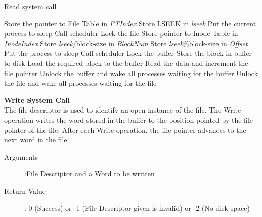 \documentclass[10pt]{article}
\begin{document}
\begin{algorithm}
\caption{Read system call}
\begin{algorithmic}
\ENDIF
{}
\ELSE 
    \STATE Store the pointer to File Table in  \textit{FTIndex}
    \STATE Store LSEEK in \textit{lseek}
\ENDIF
{}
            \STATE Put the current process to sleep
            \STATE Call scheduler
        \ENDWHILE
    \ENDIF
\ENDIF
\STATE Lock the file
\STATE Store pointer to Inode Table in  \textit{InodeIndex}
\ELSE 
    \STATE Store \textit{lseek}/block-size in \textit{BlockNum}
    \STATE Store \textit{lseek}\%block-size in \textit{Offset}
\ENDIF
{}
            \STATE Put the process to sleep 
            \STATE Call scheduler
        \ENDWHILE
    \ENDIF
\ENDIF
\STATE Lock the buffer
        \STATE Store the block in buffer to disk
    \ENDIF
    \STATE Load the required block to the buffer
\ENDIF
\STATE Read the data and increment the file pointer
\STATE Unlock the buffer and wake all processes waiting for the buffer
\STATE Unlock the file and wake all processes waiting for the file
\end{algorithmic}
\end{algorithm}
\vspace{3mm}
\textbf{Write System Call}
\vspace{2mm}\\
The file descriptor is used to identify an open instance of the file. The Write operation writes the word stored in the buffer to the position pointed by the file pointer of the file. After each Write operation, the file pointer advances to the next word in the file.
\begin{description}
	\item[Arguments]:File Descriptor and a Word to be written
	\item[Return Value]: 0 (Success) or -1 (File Descriptor given is invalid) or -2 (No disk space)
\end{description} 
\end{document}

